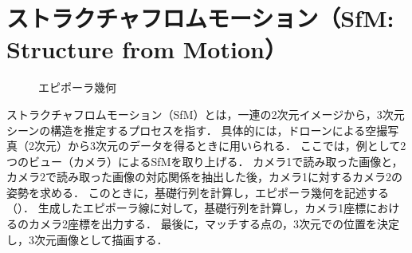 \section{ストラクチャフロムモーション（SfM: Structure from Motion）}
\begin{wrapfigure}{r}[0mm]{.5\textwidth}
    \centering
    \vspace{-.5cm}
    
    \caption{エピポーラ幾何}
    \label{fig:エピポーラ幾何}
\end{wrapfigure}
ストラクチャフロムモーション（SfM）とは，一連の2次元イメージから，3次元シーンの構造を推定するプロセスを指す．
具体的には，ドローンによる空撮写真（2次元）から3次元のデータを得るときに用いられる．
ここでは，例として2つのビュー（カメラ）によるSfMを取り上げる．
カメラ1で読み取った画像と，カメラ2で読み取った画像の対応関係を抽出した後，カメラ1に対するカメラ2の姿勢を求める．
このときに，基礎行列を計算し，エピポーラ幾何を記述する（）．
生成したエピポーラ線に対して，基礎行列を計算し，カメラ1座標におけるのカメラ2座標を出力する．
最後に，マッチする点の，3次元での位置を決定し，3次元画像として描画する．
\begin{flushright}
    \cite{SfM}
\end{flushright}